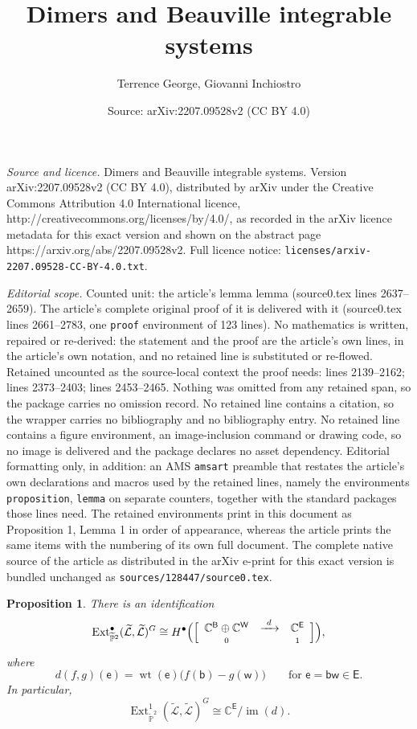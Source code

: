 \documentclass[10pt,a4paper]{amsart}
\title{Dimers and Beauville integrable systems}
\author{Terrence George, Giovanni Inchiostro}
\date{Source: arXiv:2207.09528v2 (CC BY 4.0)}
\newtheorem{proposition}{Proposition}
\def\B{\mathsf B}
\newcommand{\C}{{\mathbb C}}
\def\E{\mathsf E}
\def\Ext{\operatorname{Ext}}
\renewcommand{\P}{{\mathbb P}}
\def\W{\mathsf W}
\def\b{\mathsf b}
\def\e{\mathsf e}
\def\w{\mathsf w}
\newcommand{\wt}{\operatorname{wt}}
\begin{document}
\maketitle

\noindent\emph{Source and licence.} Dimers and Beauville integrable systems. Version arXiv:2207.09528v2 (CC BY 4.0), distributed by arXiv under the Creative Commons Attribution 4.0 International licence, http://creativecommons.org/licenses/by/4.0/, as recorded in the arXiv licence metadata for this exact version and shown on the abstract page https://arxiv.org/abs/2207.09528v2. Full licence notice: \texttt{licenses/arxiv-2207.09528-CC-BY-4.0.txt}.\par\smallskip

\noindent\textit{Editorial scope.} Counted unit: the article's lemma lemma (source0.tex lines 2637--2659). The article's complete original proof of it is delivered with it (source0.tex lines 2661--2783, one \texttt{proof} environment of 123 lines). No mathematics is written, repaired or re-derived: the statement and the proof are the article's own lines, in the article's own notation, and no retained line is substituted or re-flowed.  Retained uncounted as the source-local context the proof needs: lines 2139--2162; lines 2373--2403; lines 2453--2465.  Nothing was omitted from any retained span, so the package carries no omission record.  No retained line contains a citation, so the wrapper carries no bibliography and no bibliography entry.  No retained line contains a figure environment, an image-inclusion command or drawing code, so no image is delivered and the package declares no asset dependency.  Editorial formatting only, in addition: an AMS \texttt{amsart} preamble that restates the article's own declarations and macros used by the retained lines, namely the environments \texttt{proposition}, \texttt{lemma} on separate counters, together with the standard packages those lines need.  The retained environments print in this document as Proposition 1, Lemma 1 in order of appearance, whereas the article prints the same items with the numbering of its own full document.  The complete native source of the article as distributed in the arXiv e-print for this exact version is bundled unchanged as \texttt{sources/128447/source0.tex}.
\begin{proposition}\label{prop:repext}
There is an identification
\[
\Ext^\bullet_{\widetilde\P^2}(\widetilde{\mathcal L},\widetilde{\mathcal L})^{G}
\cong
H^\bullet\Bigl(\Bigl[
\begin{array}{c c c}
\C^{\B}\oplus \C^{\W} & \xrightarrow{\ d\ } & \C^{\E}\\[-.4ex]
{\scriptstyle 0} && {\scriptstyle 1}
\end{array}
\Bigr]\Bigr),
\]
where
\[
d(f,g)(\e)=\wt(\e)\bigl(f(\b)-g(\w)\bigr)
\qquad\text{for }\e=\b\w\in \E.
\]
In particular,
\[
\Ext^1_{\widetilde\P^2}(\widetilde{\mathcal L},\widetilde{\mathcal L})^{G}
\cong
\C^{\E}/\operatorname{im}(d).
\]
\end{proposition}
\end{document}
